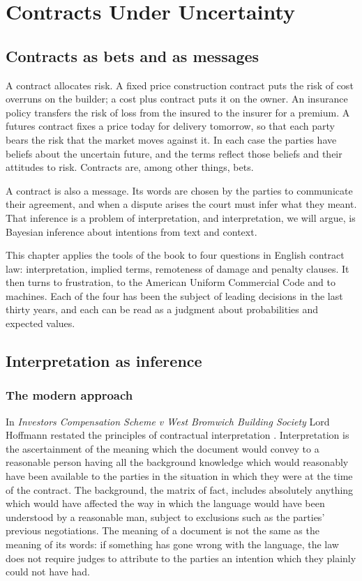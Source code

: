\chapter{Contracts Under Uncertainty}
\label{ch:contract}

\section{Contracts as bets and as messages}

A contract allocates risk. A fixed price construction contract puts the risk of cost overruns on the builder; a cost plus contract puts it on the owner. An insurance policy transfers the risk of loss from the insured to the insurer for a premium. A futures contract fixes a price today for delivery tomorrow, so that each party bears the risk that the market moves against it. In each case the parties have beliefs about the uncertain future, and the terms reflect those beliefs and their attitudes to risk. Contracts are, among other things, bets.

A contract is also a message. Its words are chosen by the parties to communicate their agreement, and when a dispute arises the court must infer what they meant. That inference is a problem of interpretation, and interpretation, we will argue, is Bayesian inference about intentions from text and context.

This chapter applies the tools of the book to four questions in English contract law: interpretation, implied terms, remoteness of damage and penalty clauses. It then turns to frustration, to the American Uniform Commercial Code and to machines. Each of the four has been the subject of leading decisions in the last thirty years, and each can be read as a judgment about probabilities and expected values.

\section{Interpretation as inference}

\subsection{The modern approach}

In \emph{Investors Compensation Scheme v West Bromwich Building Society} Lord Hoffmann restated the principles of contractual interpretation \citep{ics1998}. Interpretation is the ascertainment of the meaning which the document would convey to a reasonable person having all the background knowledge which would reasonably have been available to the parties in the situation in which they were at the time of the contract. The background, the matrix of fact, includes absolutely anything which would have affected the way in which the language would have been understood by a reasonable man, subject to exclusions such as the parties' previous negotiations. The meaning of a document is not the same as the meaning of its words: if something has gone wrong with the language, the law does not require judges to attribute to the parties an intention which they plainly could not have had.

